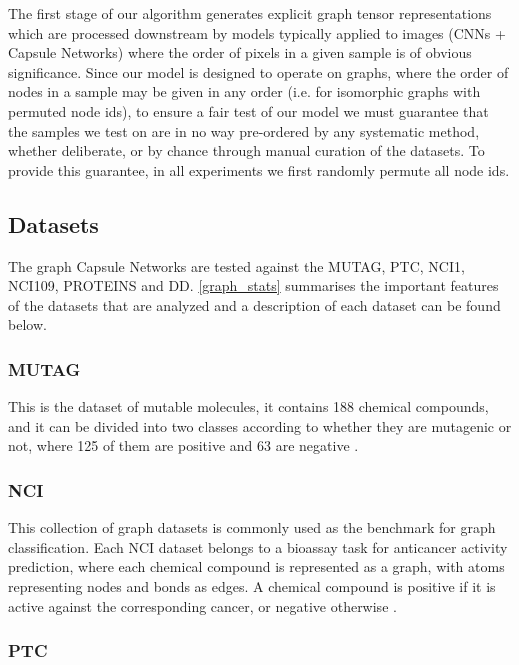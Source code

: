 \documentclass[conference]{IEEEtran}
\begin{document}
The first stage of our algorithm generates explicit graph tensor representations which are processed downstream by models typically applied to images (CNNs + Capsule Networks) where the order of pixels in a given sample is of obvious significance. Since our model is designed to operate on graphs, where the order of nodes in a sample may be given in any order (i.e. for isomorphic graphs with permuted node ids), to ensure a fair test of our model we must guarantee that the samples we test on are in no way pre-ordered by any systematic method, whether deliberate, or by chance through manual curation of the datasets. To provide this guarantee, in all experiments we first randomly permute all node ids.

\subsection{Datasets}
 
The graph Capsule Networks are tested against the MUTAG, PTC, NCI1, NCI109, PROTEINS and DD. \autoref{graph_stats} summarises the important features of the datasets that are analyzed and a description of each dataset can be found below.
 
\subsubsection*{MUTAG}

This is the dataset of mutable molecules, it contains 188 chemical compounds, and it can be divided into two classes according to whether they are mutagenic or not, where 125 of them are positive and 63 are negative \cite{yu2017graph}.

\subsubsection*{NCI}

This collection of graph datasets is commonly used as the benchmark for graph classification. Each NCI dataset belongs to a bioassay task for anticancer activity prediction, where each chemical compound is represented as a graph, with atoms representing nodes and bonds as edges. A chemical compound is positive if it is active against the corresponding cancer, or negative otherwise \cite{pan2015cogboost}.

\subsubsection*{PTC}
\end{document}
